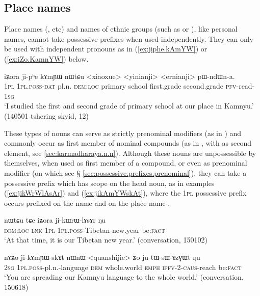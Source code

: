  

\subsection{Place names}  \label{sec:place.names}
Place names (,  etc) and names of ethnic groups (such as  or ), like personal names, cannot take possessive prefixes when used independently. They can only be used with independent pronouns as in (\ref{ex:jiphe.kAmYW}) or (\ref{ex:iZo.KamnYW}) below.

\begin{exe}
\ex \label{ex:jiphe.kAmYW}
\gll   iʑora ji-pʰe kɤmɲɯ nɯtɕu <xiaoxue> <yinianji> <ernianji> pɯ-ndɯn-a. \\
\textsc{1pl} \textsc{1pl}.\textsc{poss}-\textsc{dat} pl.n. \textsc{dem}:\textsc{loc} primary school first.grade second.grade \textsc{pfv}-read-\textsc{1sg} \\
\glt `I studied the first and second grade of primary school at our place in Kamnyu.' (140501 tshering skyid, 12)
\end{exe}

These types of nouns can serve as strictly prenominal modifiers (as in ) and commonly occur as first member of nominal compounds (as in , with  as second element, see \ref{sec:karmadharaya.n.n}). Although these nouns are  unpossessible by themselves, when used as first member of a compound, or even as prenominal modifier (on which see § \ref{sec:possessive.prefixes.prenominal}), they can take a possessive prefix which has scope on the head noun, as in examples (\ref{ex:jikWrWlAsAr}) and (\ref{ex:jikAmYWskAt}), where the \textsc{1pl} possessive prefix  occurs prefixed on the name  and on the place name  .

\begin{exe}
\ex \label{ex:jikWrWlAsAr}
 \gll nɯtɕu tɕe iʑora ji-kɯrɯ-lɤsɤr ŋu \\
 \textsc{dem}:\textsc{loc} \textsc{lnk} \textsc{1pl} \textsc{1pl}.\textsc{poss}-Tibetan-new.year be:\textsc{fact} \\
 \glt `At that time, it is our Tibetan new year.' (conversation, 150102)
\end{exe}

\begin{exe}
\ex \label{ex:jikAmYWskAt}
 \gll nɤʑo ji-kɤmɲɯ-skɤt nɯnɯ <quanshijie> ʑo ju-tɯ-sɯ-ɤzɣɯt ŋu \\
 \textsc{2sg} \textsc{1pl}.\textsc{poss}-pl.n.-language \textsc{dem} whole.world \textsc{emph} \textsc{ipfv}-2-\textsc{caus}-reach be:\textsc{fact} \\
  \glt `You are spreading our Kamnyu language to the whole world.' (conversation, 150618)
\end{exe}

